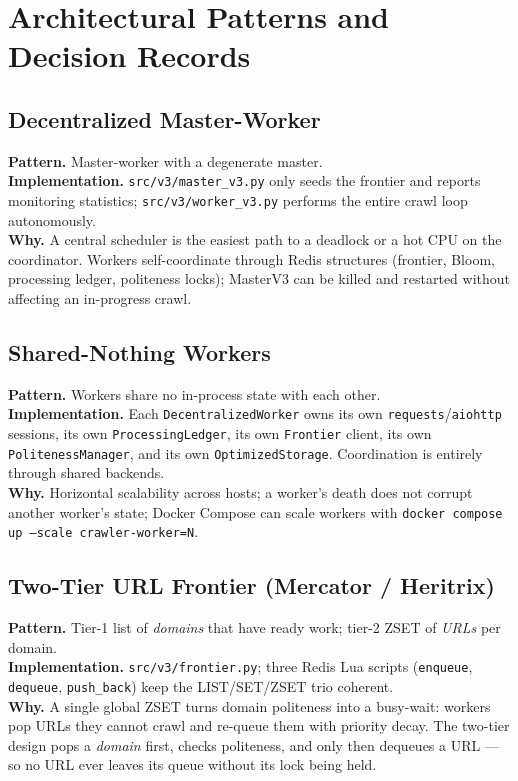 \documentclass[11pt,a4paper]{article}
\newcommand{\code}[1]{\texttt{#1}}
\begin{document}
\section{Architectural Patterns and Decision Records}

\subsection{Decentralized Master-Worker}

\textbf{Pattern.} Master-worker with a degenerate master.\\
\textbf{Implementation.} \code{src/v3/master\_v3.py} only seeds the frontier and reports monitoring statistics; \code{src/v3/worker\_v3.py} performs the entire crawl loop autonomously.\\
\textbf{Why.} A central scheduler is the easiest path to a deadlock or a hot CPU on the coordinator. Workers self-coordinate through Redis structures (frontier, Bloom, processing ledger, politeness locks); MasterV3 can be killed and restarted without affecting an in-progress crawl.

\subsection{Shared-Nothing Workers}

\textbf{Pattern.} Workers share no in-process state with each other.\\
\textbf{Implementation.} Each \code{DecentralizedWorker} owns its own \code{requests}/\code{aiohttp} sessions, its own \code{ProcessingLedger}, its own \code{Frontier} client, its own \code{PolitenessManager}, and its own \code{OptimizedStorage}. Coordination is entirely through shared backends.\\
\textbf{Why.} Horizontal scalability across hosts; a worker's death does not corrupt another worker's state; Docker Compose can scale workers with \code{docker compose up --scale crawler-worker=N}.

\subsection{Two-Tier URL Frontier (Mercator / Heritrix)}

\textbf{Pattern.} Tier-1 list of \emph{domains} that have ready work; tier-2 ZSET of \emph{URLs} per domain.\\
\textbf{Implementation.} \code{src/v3/frontier.py}; three Redis Lua scripts (\code{enqueue}, \code{dequeue}, \code{push\_back}) keep the LIST/SET/ZSET trio coherent.\\
\textbf{Why.} A single global ZSET turns domain politeness into a busy-wait: workers pop URLs they cannot crawl and re-queue them with priority decay. The two-tier design pops a \emph{domain} first, checks politeness, and only then dequeues a URL --- so no URL ever leaves its queue without its lock being held.
\end{document}
